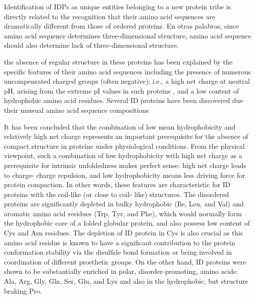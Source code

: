 Identification of IDPs as unique entities belonging to a new protein tribe is directly related to the recognition that their amino acid sequences are dramatically different from those of ordered proteins.
En otras palabras, since amino acid sequence determines three-dimensional structure, amino acid sequence should also determine lack of three-dimensional structure.

the absence of regular structure in these proteins has been explained by the specific features of their amino acid sequences including the presence of numerous uncompensated charged groups (often negative); 
 i.e., a high net charge at neutral pH, arising from the extreme pI values in such proteins , and a low content of hydrophobic amino acid residues.
Several ID proteins have been discovered due their unusual amino acid sequence compositions

It has been concluded that the combination of low mean hydrophobicity and relatively high net charge represents an important prerequisite for the absence of compact structure in proteins under physiological conditions.
From the physical viewpoint, such a combination of low hydrophobicity with high net charge as a prerequisite for intrinsic unfoldedness makes perfect sense: high net charge leads to charge-
charge repulsion, and low hydrophobicity means less driving force for protein compaction. In other words, these features are characteristic for ID proteins with the coil-like (or close to coil-
like) structures.
The disordered proteins are significantly depleted in bulky hydrophobic (Ile, Leu, and Val) and aromatic amino acid residues (Trp, Tyr, and Phe), which would normally form the hydrophobic core of a folded globular protein, and also possess low content of Cys and Asn residues.
The depletion of ID protein in Cys is also crucial as this amino acid residue is known to have a significant contribution to the protein conformation stability via the disulfide bond formation or being involved in coordination of different prosthetic groups.
On the other hand, ID proteins were shown to be substantially enriched in polar, disorder-promoting, amino acids: Ala, Arg, Gly, Gln, Ser, Glu, and Lys and also in the hydrophobic, but structure braking Pro.



